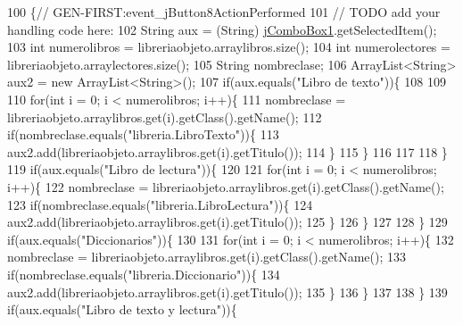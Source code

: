 \begin{DoxyCode}
100                                                                          \{\textcolor{comment}{//
      GEN-FIRST:event\_jButton8ActionPerformed}
101         \textcolor{comment}{// TODO add your handling code here:}
102         String aux = (String) \mbox{\hyperlink{class_interfaz_package_1_1_interfaz_consulta_adc5bff154b6dcb8682ea4727b7783ee5}{jComboBox1}}.getSelectedItem();
103         \textcolor{keywordtype}{int} numerolibros = libreriaobjeto.arraylibros.size();
104         \textcolor{keywordtype}{int} numerolectores = libreriaobjeto.arraylectores.size();
105         String nombreclase;
106         ArrayList<String> aux2 = \textcolor{keyword}{new} ArrayList<String>();
107         \textcolor{keywordflow}{if}(aux.equals(\textcolor{stringliteral}{"Libro de texto"}))\{
108             
109             
110             \textcolor{keywordflow}{for}(\textcolor{keywordtype}{int} i = 0; i < numerolibros; i++)\{
111                 nombreclase = libreriaobjeto.arraylibros.get(i).getClass().getName();
112                 \textcolor{keywordflow}{if}(nombreclase.equals(\textcolor{stringliteral}{"libreria.LibroTexto"}))\{
113                      aux2.add(libreriaobjeto.arraylibros.get(i).getTitulo());
114                 \}
115             \}
116              
117             
118         \}
119         \textcolor{keywordflow}{if}(aux.equals(\textcolor{stringliteral}{"Libro de lectura"}))\{
120             
121             \textcolor{keywordflow}{for}(\textcolor{keywordtype}{int} i = 0; i < numerolibros; i++)\{
122                 nombreclase = libreriaobjeto.arraylibros.get(i).getClass().getName();
123                 \textcolor{keywordflow}{if}(nombreclase.equals(\textcolor{stringliteral}{"libreria.LibroLectura"}))\{
124                     aux2.add(libreriaobjeto.arraylibros.get(i).getTitulo());
125                 \}
126             \}
127             
128         \}
129         \textcolor{keywordflow}{if}(aux.equals(\textcolor{stringliteral}{"Diccionarios"}))\{
130             
131             \textcolor{keywordflow}{for}(\textcolor{keywordtype}{int} i = 0; i < numerolibros; i++)\{
132                 nombreclase = libreriaobjeto.arraylibros.get(i).getClass().getName();
133                 \textcolor{keywordflow}{if}(nombreclase.equals(\textcolor{stringliteral}{"libreria.Diccionario"}))\{
134                     aux2.add(libreriaobjeto.arraylibros.get(i).getTitulo());
135                 \}
136             \}
137             
138         \}
139         \textcolor{keywordflow}{if}(aux.equals(\textcolor{stringliteral}{"Libro de texto y lectura"}))\{

\end{DoxyCode}
